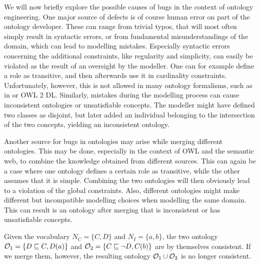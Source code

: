 We will now briefly explore the possible causes of bugs in the context of ontology engineering. One major source of defects is of course human error on part of the ontology developer. These can range from trivial typos, that will most often simply result in syntactic errors, or from fundamental misunderstandings of the domain, which can lead to modelling mistakes. Especially syntactic errors concerning the additional constraints, like regularity and simplicity, can easily be violated as the result of an oversight by the modeller. One can for example define a role as transitive, and then afterwards use it in cardinality constraints. Unfortunately, however, this is not allowed in many ontology formalisms, such as in \SROIQ or OWL 2 DL. Similarly, mistakes during the modelling process can cause inconsistent ontologies or unsatisfiable concepts. The modeller might have defined two classes as disjoint, but later added an individual belonging to the intersection of the two concepts, yielding an inconsistent ontology.

Another source for bugs in ontologies may arise while merging different ontologies. This may be done, especially in the context of OWL and the semantic web, to combine the knowledge obtained from different sources. This can again be a case where one ontology defines a certain role as transitive, while the other assumes that it is simple. Combining the two ontologies will then obviously lead to a violation of the global constraints. Also, different ontologies might make different but incompatible modelling choices when modelling the same domain. This can result is an ontology after merging that is inconsistent or has unsatisfiable concepts.

\begin{example}
  Given the vocabulary $N_C = \{ C, D \}$ and $N_I = \{ a, b \}$, the two \SROIQ ontology $\mathcal{O}_1 = \{ D \sqsubseteq C, D(a) \}$ and $\mathcal{O}_2 = \{ C \sqsubseteq \lnot D, C(b) \}$ are by themselves consistent. If we merge them, however, the resulting ontology $\mathcal{O}_1 \cup \mathcal{O}_2$ is no longer consistent.
\end{example}
